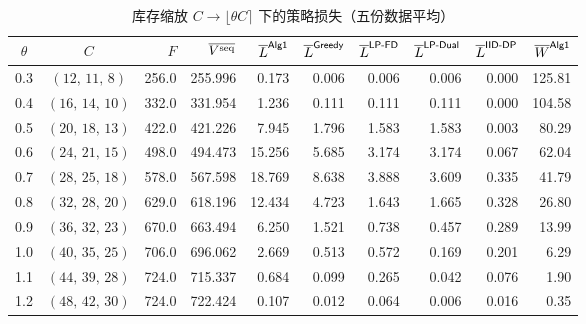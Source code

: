 \begin{table}[htbp]
\centering\footnotesize
\caption{库存缩放 $C\to\lfloor\theta C\rceil$ 下的策略损失（五份数据平均）}\label{tab:theta}
\begin{tabular}{ccrrrrrrrr}
\toprule
$\theta$ & $C$ & $F$ & $\overline{V^{\mathrm{seq}}}$ & $\overline L^{\textsf{Alg1}}$ & $\overline L^{\textsf{Greedy}}$ & $\overline L^{\textsf{LP-FD}}$ & $\overline L^{\textsf{LP-Dual}}$ & $\overline L^{\textsf{IID-DP}}$ & $\overline W^{\textsf{Alg1}}$ \\
\midrule
0.3 & $(12,\,11,\,8)$ & 256.0 & 255.996 & 0.173 & 0.006 & 0.006 & 0.006 & 0.000 & 125.81 \\
0.4 & $(16,\,14,\,10)$ & 332.0 & 331.954 & 1.236 & 0.111 & 0.111 & 0.111 & 0.000 & 104.58 \\
0.5 & $(20,\,18,\,13)$ & 422.0 & 421.226 & 7.945 & 1.796 & 1.583 & 1.583 & 0.003 & 80.29 \\
0.6 & $(24,\,21,\,15)$ & 498.0 & 494.473 & 15.256 & 5.685 & 3.174 & 3.174 & 0.067 & 62.04 \\
0.7 & $(28,\,25,\,18)$ & 578.0 & 567.598 & 18.769 & 8.638 & 3.888 & 3.609 & 0.335 & 41.79 \\
0.8 & $(32,\,28,\,20)$ & 629.0 & 618.196 & 12.434 & 4.723 & 1.643 & 1.665 & 0.328 & 26.80 \\
0.9 & $(36,\,32,\,23)$ & 670.0 & 663.494 & 6.250 & 1.521 & 0.738 & 0.457 & 0.289 & 13.99 \\
1.0 & $(40,\,35,\,25)$ & 706.0 & 696.062 & 2.669 & 0.513 & 0.572 & 0.169 & 0.201 & 6.29 \\
1.1 & $(44,\,39,\,28)$ & 724.0 & 715.337 & 0.684 & 0.099 & 0.265 & 0.042 & 0.076 & 1.90 \\
1.2 & $(48,\,42,\,30)$ & 724.0 & 722.424 & 0.107 & 0.012 & 0.064 & 0.006 & 0.016 & 0.35 \\
\bottomrule
\end{tabular}
\end{table}
